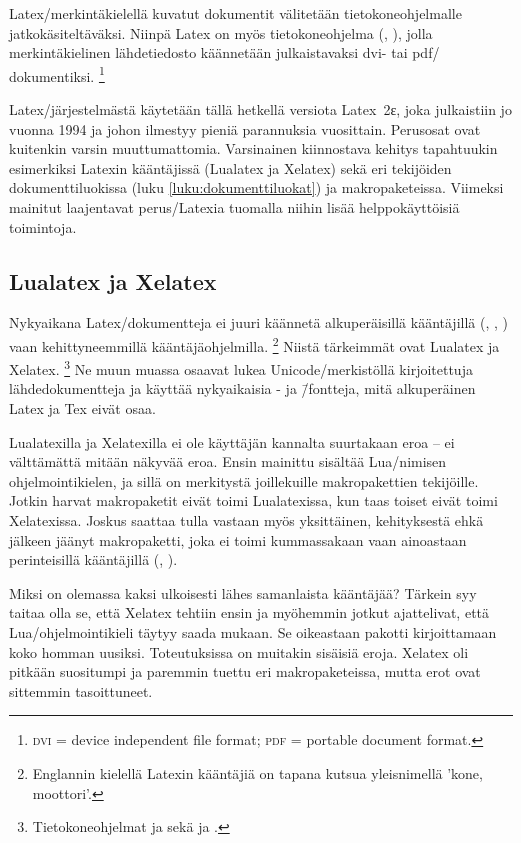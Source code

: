 Latex\-/merkintäkielellä kuvatut dokumentit välitetään
tietokoneohjelmalle jatkokäsiteltäväksi. Niinpä Latex on myös
tietokoneohjelma (, ), jolla
merkintäkielinen lähdetiedosto käännetään julkaistavaksi dvi- tai pdf\-/
dokumentiksi.%
\footnote{\textsc{dvi} = device independent file format; \textsc{pdf} =
  portable document format.}

Latex\-/järjestelmästä käytetään tällä hetkellä versiota Latex~2ε, joka
julkaistiin jo vuonna 1994 ja johon ilmestyy pieniä parannuksia
vuosittain. Perusosat ovat kuitenkin varsin muuttumattomia. Varsinainen
kiinnostava kehitys tapahtuukin esimerkiksi Latexin kääntäjissä
(Lualatex ja Xelatex) sekä eri tekijöiden dokumenttiluokissa (luku
\ref{luku:dokumenttiluokat}) ja makropaketeissa. Viimeksi mainitut
laajentavat perus\-/Latexia tuomalla niihin lisää helppokäyttöisiä
toimintoja.

\subsection{Lualatex ja Xelatex}

Nyky\-aikana Latex\-/dokumentteja ei juuri käännetä alkuperäisillä
kääntäjillä (, , ) vaan
kehittyneemmillä kään\-täjä\-ohjel\-milla.%
\footnote{Englannin kielellä Latexin kääntäjiä on tapana kutsua
  yleisnimellä \emph{} 'kone, moottori'.} Niistä
tärkeimmät ovat Lualatex ja Xelatex.%
\footnote{Tietokoneohjelmat  ja  sekä
   ja .} Ne muun muassa osaavat lukea
Unicode\-/merkistöllä kirjoitettuja lähdedokumentteja ja käyttää
nyky\-aikaisia - ja 
\=/fontteja, mitä alkuperäinen Latex ja Tex eivät osaa.

Lualatexilla ja Xelatexilla ei ole käyttäjän kannalta suurtakaan eroa --
ei välttämättä mitään näkyvää eroa. Ensin mainittu sisältää
Lua\-/nimisen ohjelmointikielen, ja sillä on merkitystä joillekuille
makropakettien tekijöille. Jotkin harvat makropaketit eivät toimi
Lualatexissa, kun taas toiset eivät toimi Xelatexissa. Joskus saattaa
tulla vastaan myös yksittäinen, kehityksestä ehkä jälkeen jäänyt
makropaketti, joka ei toimi kummassakaan vaan ainoastaan perinteisillä
kääntäjillä (, ).

Miksi on olemassa kaksi ulkoisesti lähes samanlaista kääntäjää? Tärkein
syy taitaa olla se, että Xelatex tehtiin ensin ja myöhemmin jotkut
ajattelivat, että Lua\-/ohjelmointikieli täytyy saada mukaan. Se
oikeastaan pakotti kirjoittamaan koko homman uusiksi. Toteutuksissa on
muitakin sisäisiä eroja. Xelatex oli pitkään suositumpi ja paremmin
tuettu eri makropaketeissa, mutta erot ovat sittemmin tasoittuneet.

